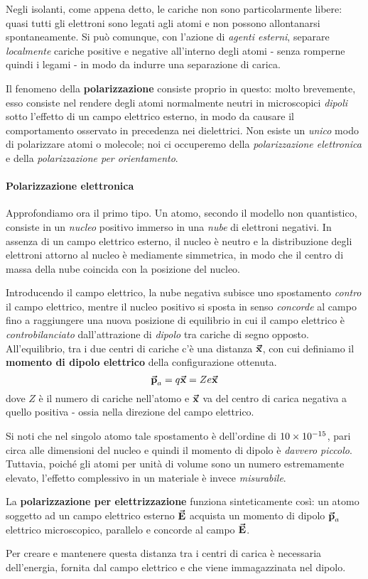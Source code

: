 Negli isolanti, come appena detto, le cariche non sono particolarmente libere: quasi tutti gli elettroni sono legati agli atomi e non possono allontanarsi spontaneamente. Si può comunque, con l'azione di \textit{agenti esterni}, separare \textit{localmente} cariche positive e negative all'interno degli atomi - senza romperne quindi i legami - in modo da indurre una separazione di carica.

Il fenomeno della \textbf{polarizzazione} consiste proprio in questo: molto brevemente, esso consiste nel rendere degli atomi normalmente neutri in microscopici \textit{dipoli} sotto l'effetto di un campo elettrico esterno, in modo da causare il comportamento osservato in precedenza nei dielettrici. Non esiste un \textit{unico} modo di polarizzare atomi o molecole; noi ci occuperemo della \textit{polarizzazione elettronica} e della \textit{polarizzazione per orientamento}.
\paragraph{Polarizzazione elettronica}
Approfondiamo ora il primo tipo. Un atomo, secondo il modello non quantistico, consiste in un \textit{nucleo} positivo immerso in una \textit{nube} di elettroni negativi. In assenza di un campo elettrico esterno, il nucleo è neutro e la distribuzione degli elettroni attorno al nucleo è mediamente simmetrica, in modo che il centro di massa della nube coincida con la posizione del nucleo.

Introducendo il campo elettrico, la nube negativa subisce uno spostamento \textit{contro} il campo elettrico, mentre il nucleo positivo si sposta in senso \textit{concorde} al campo fino a raggiungere una nuova posizione di equilibrio in cui il campo elettrico è \textit{controbilanciato} dall'attrazione di \textit{dipolo} tra cariche di segno opposto.
All'equilibrio, tra i due centri di cariche c'è una distanza $\vb*{\va{x}}$, con cui definiamo il \textbf{momento di dipolo elettrico} della configurazione ottenuta.
\begin{equation}
	\vb*{\va{p}}_a=q\vb*{\va{x}}=Ze\vb*{\va{x}}
\end{equation}
dove $Z$ è il numero di cariche nell'atomo e $\vb*{\va{x}}$ va del centro di carica negativa a quello positiva - ossia nella direzione del campo elettrico.
\begin{observe}
	Si noti che nel singolo atomo tale spostamento è dell'ordine di $\num{10d-15}$, pari circa alle dimensioni del nucleo e quindi il momento di dipolo è \textit{davvero piccolo}. Tuttavia, poiché gli atomi per unità di volume sono un numero estremamente elevato, l'effetto complessivo in un materiale è invece \textit{misurabile}.
\end{observe}
La \textbf{polarizzazione per elettrizzazione} funziona sinteticamente così: un atomo soggetto ad un campo elettrico esterno $\vb*{\va{E}}$ acquista un momento di dipolo $\vb*{\va{p}}_a$ elettrico microscopico, parallelo e concorde al campo $\vb*{\va{E}}$.
\begin{observe}
	Per creare e mantenere questa distanza tra i centri di carica è necessaria dell'energia, fornita dal campo elettrico e che viene immagazzinata nel dipolo.
\end{observe}
